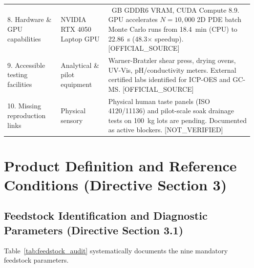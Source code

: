 \documentclass[10pt,a4paper]{article}
\newcommand{\epistag}[1]{\textsf{\scriptsize\textcolor{fnqslate}{[#1]}}}
\begin{document}
\begin{table}[H]
\begin{tabularx}{\linewidth}{p{3.2cm}p{4.2cm}>{\raggedright\arraybackslash}X}
8. Hardware \& GPU capabilities & NVIDIA RTX 4050 Laptop GPU & 6~GB GDDR6 VRAM, CUDA Compute 8.9. GPU accelerates $N=10,000$ 2D PDE batch Monte Carlo runs from 18.4~min (CPU) to 22.86~s (48.3$\times$ speedup). \epistag{OFFICIAL\_SOURCE} \\
9. Accessible testing facilities & Analytical \& pilot equipment & Warner-Bratzler shear press, drying ovens, UV-Vis, pH/conductivity meters. External certified labs identified for ICP-OES and GC-MS. \epistag{OFFICIAL\_SOURCE} \\
10. Missing reproduction links & Physical sensory & Physical human taste panels (ISO 4120/11136) and pilot-scale soak drainage tests on 100~kg lots are pending. Documented as active blockers. \epistag{NOT\_VERIFIED} \\
\bottomrule
\end{tabularx}
\end{table}

\section{Product Definition and Reference Conditions (Directive Section 3)}

\subsection{Feedstock Identification and Diagnostic Parameters (Directive Section 3.1)}
Table~\ref{tab:feedstock_audit} systematically documents the nine mandatory feedstock parameters.
\end{document}
